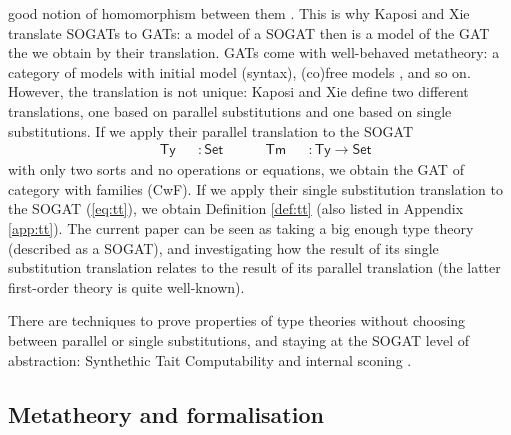 \documentclass[a4paper,UKenglish]{article}
\newcommand{\ra}{\rightarrow}
\newcommand{\Set}{\mathsf{Set}}
\newcommand{\Ty}{\mathsf{Ty}}
\newcommand{\Tm}{\mathsf{Tm}}
\begin{document}
good notion of homomorphism between them \cite[bottom of page 5]{DBLP:conf/fscd/KaposiX24}. This is why Kaposi and Xie
\cite{DBLP:conf/fscd/KaposiX24} translate SOGATs to GATs: a model of a
SOGAT then is a model of the GAT the we obtain by their
translation. GATs come with well-behaved metatheory: a category of
models with initial model (syntax), (co)free models
\cite{andras,DBLP:phd/hal/Moeneclaey22}, and so on. However, the
translation is not unique: Kaposi and Xie
\cite{DBLP:conf/fscd/KaposiX24} define two different translations, one
based on parallel substitutions and one based on single
substitutions. If we apply their parallel translation to the SOGAT
\begin{equation}\label{eq:tytm}
\begin{alignedat}{10}
  & \Ty && : \Set \hspace{3em} \Tm && : \Ty \ra\Set
\end{alignedat}
\end{equation}
with only two sorts and no operations or equations, we obtain the GAT
of category with families (CwF). If we apply their single substitution
translation to the SOGAT (\ref{eq:tt}), we obtain Definition
\ref{def:tt} (also listed in Appendix \ref{app:tt}). The current paper
can be seen as taking a big enough type theory (described as a SOGAT),
and investigating how the result of its single substitution
translation relates to the result of its parallel translation (the
latter first-order theory is quite well-known).

There are techniques to prove properties of type theories without
choosing between parallel or single substitutions, and staying at the
SOGAT level of abstraction: Synthethic Tait Computability
\cite{DBLP:phd/us/Sterling22} and internal sconing
\cite{DBLP:conf/fscd/BocquetKS23}.

\vspace{-0.7em}
\subsection{Metatheory and formalisation}\label{sec:metatheory}
\end{document}
